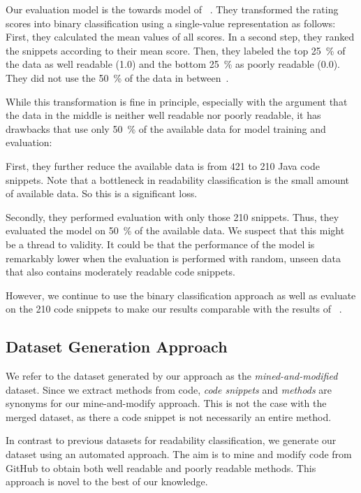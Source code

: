 \documentclass[%
class=scrreprt,
chapterprefix=false,%
open=right,%
twoside=false,%
paper=a4,%
logofile={Logo\_zentral\_farbig\_EN.png},%
thesistype=master,%
UKenglish,%
]{se2thesis}
\theoremstyle{definition}
\begin{document}
	Our evaluation model is the towards model of \citeauthor{mi2022towards}~\cite{mi2022towards}. They transformed the rating scores into binary classification using a single-value representation as follows: First, they calculated the mean values of all scores. In a second step, they ranked the snippets according to their mean score. Then, they labeled the top 25~\% of the data as well readable (1.0) and the bottom 25~\% as poorly readable (0.0). They did not use the 50~\% of the data in between~\cite{mi2022towards}.
	
	While this transformation is fine in principle, especially with the argument that the data in the middle is neither well readable nor poorly readable, it has drawbacks that \citeauthor{mi2022towards} use only 50~\% of the available data for model training and evaluation:
	
	First, they further reduce the available data is from 421 to 210 Java code snippets. Note that a bottleneck in readability classification is the small amount of available data. So this is a significant loss.
	
	Secondly, they performed evaluation with only those 210 snippets. Thus, they evaluated the model on 50~\% of the available data. We suspect that this might be a thread to validity. It could be that the performance of the model is remarkably lower when the evaluation is performed with random, unseen data that also contains moderately readable code snippets.
	
	However, we continue to use the binary classification approach as well as evaluate on the 210 code snippets to make our results comparable with the results of \citeauthor{mi2022towards}~\cite{mi2022towards}.
	
\subsection{Dataset Generation Approach} \label{Dataset Generation Approach}
	We refer to the dataset generated by our approach as the \textit{mined-and-modified} dataset.
	Since we extract methods from code, \textit{code snippets} and \textit{methods} are synonyms for our mine-and-modify approach. This is not the case with the merged dataset, as there a code snippet is not necessarily an entire method.

	In contrast to previous datasets for readability classification, we generate our dataset using an automated approach. The aim is to mine and modify code from GitHub to obtain both well readable and poorly readable methods. This approach is novel to the best of our knowledge. 
	
\end{document}

